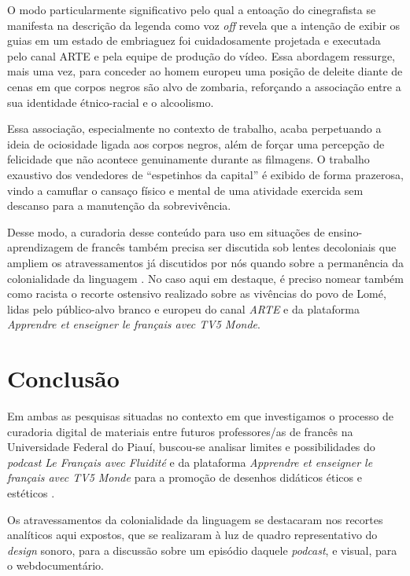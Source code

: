 \documentclass[portuguese]{textolivre}
\begin{document}
O modo particularmente significativo pelo qual a entoação do cinegrafista se manifesta na descrição da legenda como voz \textit{off} revela que a intenção de exibir os guias em um estado de embriaguez foi cuidadosamente projetada e executada pelo canal ARTE e pela equipe de produção do vídeo. Essa abordagem ressurge, mais uma vez, para conceder ao homem europeu uma posição de deleite diante de cenas em que corpos negros são alvo de zombaria, reforçando a associação entre a sua identidade étnico-racial e o alcoolismo.

Essa associação, especialmente no contexto de trabalho, acaba perpetuando a ideia de ociosidade ligada aos corpos negros, além de forçar uma percepção de felicidade que não acontece genuinamente durante as filmagens. O trabalho exaustivo dos vendedores de “espetinhos da capital” é exibido de forma prazerosa, vindo a camuflar o cansaço físico e mental de uma atividade exercida sem descanso para a manutenção da sobrevivência. 

Desse modo, a curadoria desse conteúdo para uso em situações de ensino-aprendizagem de francês também precisa ser discutida sob lentes decoloniais que ampliem os atravessamentos já discutidos por nós quando sobre a permanência da colonialidade da linguagem \cite{veronelli_sobre_2021}. No caso aqui em destaque, é preciso nomear também como racista o recorte ostensivo realizado sobre as vivências do povo de Lomé, lidas pelo público-alvo branco e europeu do canal \textit{ARTE} e da plataforma \textit{Apprendre et enseigner le français avec TV5 Monde}.


\section{Conclusão}\label{sec-organizacao-latex}
Em ambas as pesquisas situadas no contexto em que investigamos o processo de curadoria digital de materiais entre futuros professores/as de francês na Universidade Federal do Piauí, buscou-se analisar limites e possibilidades do \textit{podcast Le Français avec Fluidité} e da plataforma \textit{Apprendre et enseigner le français avec TV5 Monde} para a promoção de desenhos didáticos éticos e estéticos \cite{rocha_moocs_2019}. 

Os atravessamentos da colonialidade da linguagem se destacaram nos recortes analíticos aqui expostos, que se realizaram à luz de quadro representativo do \textit{design} sonoro, para a discussão sobre um episódio daquele \textit{podcast}, e visual, para o webdocumentário.  
\end{document}
